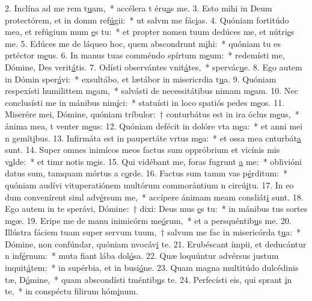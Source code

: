 2. Inclína ad me rem t\uline{u}am,~* accélera t éru\uline{a}s me.
3. Esto mihi in Deum protectórem, et in domm ref\uline{ú}gii:~* ut salvm me fác\uline{i}as.
4. Quóniam fortitúdo mea, et refúgium mum \uline{e}s tu:~* et propter nomen tuum dedúces me, et nútri\uline{e}s me.
5. Edúces me de láqueo hoc, quem abscondrunt m\uline{i}hi:~* quóniam tu es prtéctor m\uline{e}us.
6. In manus tuas comméndo spírtum m\uline{e}um:~* redemísti me, Dómine, Des verit\uline{á}tis.
7. Odísti observántes vnit\uline{á}tes,~* spervác\uline{u}e.
8. Ego autem in Dómin sper\uline{á}vi:~* exsultábo, et lætábor in misericrdia t\uline{u}a.
9. Quóniam respexísti humilittem m\uline{e}am,~* salvásti de necessitátibus nimam m\uline{e}am.
10. Nec conclusísti me in mánibus nim\uline{í}ci:~* statuísti in loco spatiós pedes m\uline{e}os.
11. Miserére mei, Dómine, quóniam tríbulor:~† conturbátus est in ira óclus m\uline{e}us,~* ánima mea, t venter m\uline{e}us:
12. Quóniam defécit in dolóre vta m\uline{e}a:~* et anni mei n gemít\uline{i}bus.
13. Infirmáta est in paupertáte vrtus m\uline{e}a:~* et ossa mea cnturbát\uline{a} sunt.
14. Super omnes inimícos meos factus sum oppróbrium et vicínis mis v\uline{a}lde:~* et timr notis m\uline{e}is.
15. Qui vidébant me, foras fugrunt \uline{a} me:~* oblivióni datus sum, tamquam mórtus a c\uline{o}rde.
16. Factus sum tamm vas p\uline{é}rditum:~* quóniam audívi vituperatiónem multórum commorántium n circú\uline{i}tu.
17. In eo dum convenírent siml adv\uline{é}rsum me,~* accípere ánimam meam consliát\uline{i} sunt.
18. Ego autem in te sperávi, Dómine:~† dixi: Deus mus \uline{e}s tu:~* in mánibus tus sortes m\uline{e}æ.
19. Eripe me de manu inimicórm me\uline{ó}rum,~* et a persquéntib\uline{u}s me.
20. Illústra fáciem tuam super servum tuum,~† salvum me fac in misericórda t\uline{u}a:~* Dómine, non confúndar, quóniam nvocáv\uline{i} te.
21. Erubéscant ímpii, et deducántur n inf\uline{é}rnum:~* muta fiant lába dol\uline{ó}sa.
22. Quæ loquúntur advérsus justum inquit\uline{á}tem:~* in supérbia, et in busi\uline{ó}ne.
23. Quam magna multitúdo dulcédinis tæ, D\uline{ó}mine,~* quam abscondísti tméntib\uline{u}s te.
24. Perfecísti eis, qui sprant \uline{i}n te,~* in conspéctu filirum hóm\uline{i}num.

